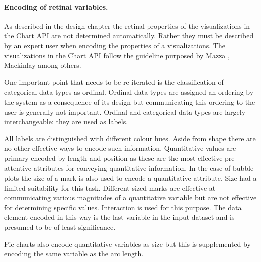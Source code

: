 \documentclass[a4paper, 11pt, titlepage, onehalfspacing]{report}
\begin{document}
\paragraph{Encoding of retinal variables.} As described in the design chapter the retinal properties of the visualizations in the Chart API are not determined automatically. Rather they must be described by an expert user when encoding the properties of a visualizations. The visualizations in the Chart API follow the guideline purposed by Mazza \cite{mazza2009introduction}, Mackinlay \cite{mackinlay1986automating} among others.

One important point that needs to be re-iterated is the classification of categorical data types as ordinal. Ordinal data types are assigned an ordering by the system as a consequence of its design but communicating this ordering to the user is generally not important. Ordinal and categorical data types are largely interchangeable: they are used as labels.

All labels are distinguished with different colour hues. Aside from shape there are no other effective ways to encode such information. Quantitative values are primary encoded by length and position as these are the most effective pre-attentive attributes for conveying quantitative information. In the case of bubble plots the size of a mark is also used to encode a quantitative attribute. Size had a limited suitability for this task. Different sized marks are effective at communicating various magnitudes of a quantitative variable but are not effective for determining specific values. Interaction is used for this purpose. The data element encoded in this way is the last variable in the input dataset and is presumed to be of least significance.

Pie-charts also encode quantitative variables as size but this is supplemented by encoding the same variable as the arc length.
\end{document}
